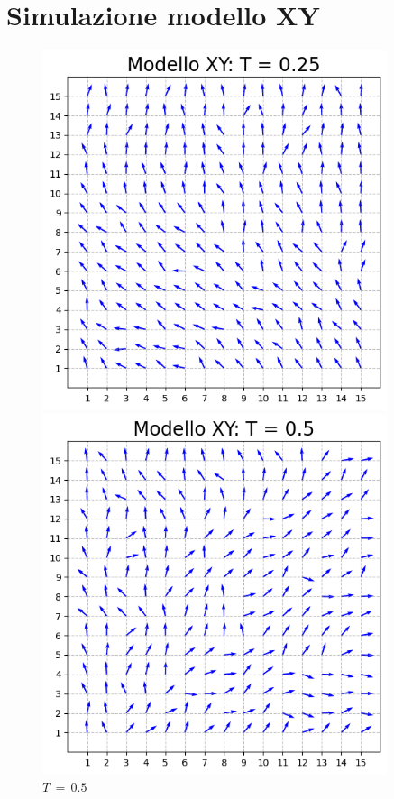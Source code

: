 \section{Simulazione modello XY}

\vspace*{\fill}

\begin{figure}[H]
    \centering
    \begin{minipage}{0.45\textwidth}  
      \centering
      \includegraphics[page=1, width=0.9\textwidth]{Immagini/simModelloXY/conf_T0.25.png}
      \caption{$T\,=\,0.25$}
    \end{minipage}\hfill
    \begin{minipage}{0.45\textwidth}  
      \centering
      \includegraphics[page=1, width=0.9\textwidth]{Immagini/simModelloXY/conf_T0.5.png}
      \caption{$T\,=\,0.5$}
    \end{minipage}
    \vspace{12pt}


\end{figure}
